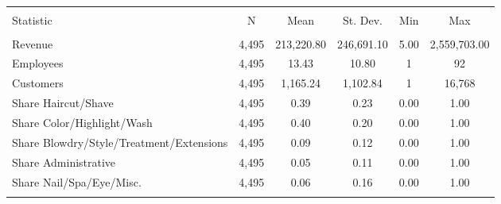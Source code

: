 
\begin{table}[!htbp] \centering 
  \caption{} 
  \label{} 
\begin{tabular}{@{\extracolsep{5pt}}lccccc} 
\\[-1.8ex]\hline 
\hline \\[-1.8ex] 
Statistic & \multicolumn{1}{c}{N} & \multicolumn{1}{c}{Mean} & \multicolumn{1}{c}{St. Dev.} & \multicolumn{1}{c}{Min} & \multicolumn{1}{c}{Max} \\ 
\hline \\[-1.8ex] 
Revenue & 4,495 & 213,220.80 & 246,691.10 & 5.00 & 2,559,703.00 \\ 
Employees & 4,495 & 13.43 & 10.80 & 1 & 92 \\ 
Customers & 4,495 & 1,165.24 & 1,102.84 & 1 & 16,768 \\ 
Share Haircut/Shave & 4,495 & 0.39 & 0.23 & 0.00 & 1.00 \\ 
Share Color/Highlight/Wash & 4,495 & 0.40 & 0.20 & 0.00 & 1.00 \\ 
Share Blowdry/Style/Treatment/Extensions & 4,495 & 0.09 & 0.12 & 0.00 & 1.00 \\ 
Share Administrative & 4,495 & 0.05 & 0.11 & 0.00 & 1.00 \\ 
Share Nail/Spa/Eye/Misc. & 4,495 & 0.06 & 0.16 & 0.00 & 1.00 \\ 
\hline \\[-1.8ex] 
\end{tabular} 
\end{table} 

